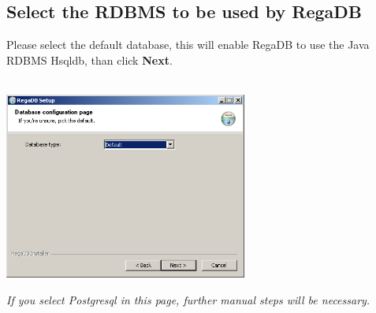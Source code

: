 \subsection{Select the RDBMS to be used by RegaDB}
Please select the default database, this will enable RegaDB to use the Java RDBMS Hsqldb, than click \textbf{Next}.
\\
\vspace{0.5cm}~ \\ \centerline{\includegraphics[width=8cm] {pics/nsis/select_database_6.png}}
\textit{If you select Postgresql in this page, further manual steps will be necessary.}

